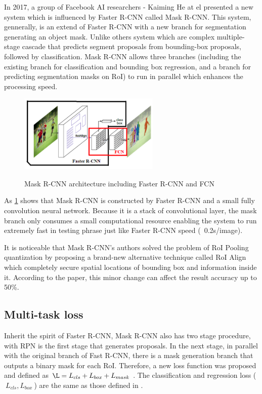 	In 2017, a group of Facebook AI researchers - Kaiming He at el presented a new system which is influenced by Faster R-CNN called Mask R-CNN. This system, gennerally, is an extend of Faster R-CNN with a new branch for segmentation generating an object mask. Unlike others system which are complex multiple-stage cascade that predicts segment proposals from bounding-box proposals, followed by classification. Mask R-CNN allows three branches (including the existing branch for classification and bounding box regression, and a branch for predicting segmentation masks on RoI) to run in parallel which enhances the processing speed.	
	
	\begin{figure}[H]
		\centering
		{\includegraphics[width=0.6\textwidth]{./hinhanh/chap5/mask_rcnn.png}}
		\caption{Mask R-CNN architecture including Faster R-CNN and FCN}
		\label{fig:maskrcnn}
	\end{figure}
	
	As \ref{fig:maskrcnn} shows that Mask R-CNN is constructed by Faster R-CNN and a small fully convolution neural network. Because it is a stack of convolutional layer, the mask branch only consumes a small computational resource enabling the system to run extremely fast in testing phrase just like Faster R-CNN speed (~0.2s/image). 
	
	It is noticeable that Mask R-CNN’s authors solved the problem of RoI Pooling quantization by proposing a brand-new alternative technique called RoI Align which completely secure spatial locations of bounding box and information inside it. According to the paper, this minor change can affect the result accuracy up to 50\%.
	
\subsection{Multi-task loss}
\label{subsection:multitaskloss}
\noindent
	
	Inherit the spirit of Faster R-CNN, Mask R-CNN also has two stage procedure, with RPN is the first stage that generates proposals. In the next stage, in parallel with the original branch of Fast R-CNN, there is a mask generation branch that outputs a binary mask for each RoI. Therefore, a new loss function was proposed and defined as $ \L = L_{cls} + L_{box} + L_{mask}\ $. The classification and regression loss ($ \ L_{cls}, L_{box} \ $) are the same as those defined in \cite{fastrcnn}. 
	

